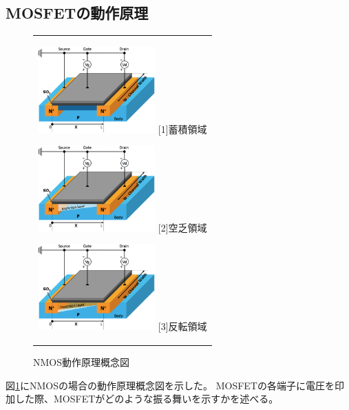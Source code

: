 	\subsection{MOSFETの動作原理}
		\begin{figure}[htbp]
			\begin{center}
				\begin{tabular}{c}
					\begin{minipage}{0.33\hsize}
						\begin{center}
							\includegraphics[clip, width=4.5cm]{./Chapter/Chapter3/Picture/MOSFET_accumulation.eps}
							\hspace{1.6cm} [1]蓄積領域
						\end{center}
					\end{minipage}
					\begin{minipage}{0.33\hsize}
						\begin{center}
							\includegraphics[clip, width=4.5cm]{./Chapter/Chapter3/Picture/MOSFET_depletion.eps}
							\hspace{1.6cm} [2]空乏領域
						\end{center}
					\end{minipage}
					\begin{minipage}{0.33\hsize}
						\begin{center}
							\includegraphics[clip, width=4.5cm]{./Chapter/Chapter3/Picture/MOSFET_inversion.eps}
							\hspace{1.6cm} [3]反転領域
						\end{center}
					\end{minipage}
				\end{tabular}
				\caption{NMOS動作原理概念図}
				\label{fig:MOSFET_N_WorkingPrinciple}
			\end{center}
		\end{figure}
		図\ref{fig:MOSFET_N_WorkingPrinciple}にNMOSの場合の動作原理概念図を示した。
		MOSFETの各端子に電圧を印加した際、MOSFETがどのような振る舞いを示すかを述べる。
		
